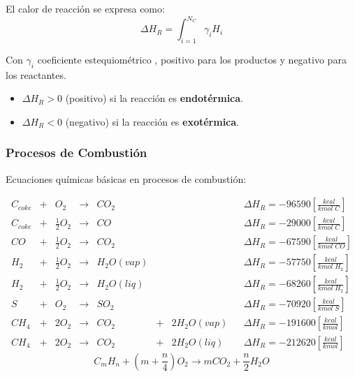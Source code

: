             
            El calor de reacción se expresa como:
            \begin{equation}
            \label{eq:calor_reaccion}
                \Delta H_{R} = \int_{i=1}^{N_{C}} \gamma_{i} H_{i}
            \end{equation}
            
            Con \(\gamma_{i}\) coeficiente estequiométrico , positivo para los productos y negativo para los reactantes.
            
            
            \begin{itemize}
                \item \(\Delta H_{R} > 0\) (positivo) si la reacción es \textbf{endotérmica}.
                \item \(\Delta H_{R} < 0\) (negativo) si la reacción es \textbf{exotérmica}.
            \end{itemize}
            
        \subsubsection{Procesos de Combustión}
        
        Ecuaciones químicas básicas en procesos de combustión:
        
        \[
        \begin{matrix}
             C_{coke} & + & O_{2} & \rightarrow & C{O}_2 & & & & \Delta H_{R} = -96590 \left [ \frac{kcal}{kmol\;C} \right ] \\
             C_{coke} & + & \frac{1}{2} O_{2} & \rightarrow & CO & & & & \Delta H_{R} = -29000 \left [ \frac{kcal}{kmol\;C} \right ] \\
             CO & + & \frac{1}{2} O_{2} & \rightarrow & C{O}_2 & & & & \Delta H_{R} = -67590 \left [ \frac{kcal}{kmol\;CO} \right ] \\
             H_{2} & + & \frac{1}{2} O_{2} & \rightarrow & H_{2}O(vap) & & & & \Delta H_{R} = -57750 \left [ \frac{kcal}{kmol\;H_{2}} \right ] \\
             H_{2} & + & \frac{1}{2} O_{2} & \rightarrow & H_{2}O(liq) & & & & \Delta H_{R} = -68260 \left [ \frac{kcal}{kmol\;H_{2}} \right ] \\
             S & + & O_{2} & \rightarrow & S{O}_2 & & & & \Delta H_{R} = -70920 \left [ \frac{kcal}{kmol\;S} \right ] \\
             C{H}_{4} & + & 2 O_{2} & \rightarrow & C{O}_2 & + & 2{H}_{2}O(vap) & & \Delta H_{R} = -191600 \left [ \frac{kcal}{kmol} \right ] \\
             C{H}_{4} & + & 2 O_{2} & \rightarrow & C{O}_2 & + & 2{H}_{2}O(liq) & & \Delta H_{R} = -212620 \left [ \frac{kcal}{kmol} \right ]
        \end{matrix}
        \]
        \[{C}_{m}{H}_{n} + \left ( m + \frac{n}{4}\right ) O_{2} \rightarrow m C{O}_{2} + \frac{n}{2} {H}_{2}O\]
        
